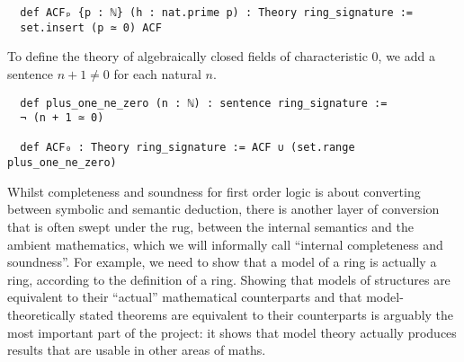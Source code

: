 \begin{dfn}
  \begin{lstlisting}
  def ACFₚ {p : ℕ} (h : nat.prime p) : Theory ring_signature :=
  set.insert (p ≃ 0) ACF\end{lstlisting}

  To define the theory of algebraically closed fields of characteristic $0$,
  we add a sentence $n + 1 \ne 0$ for each natural $n$.

  \begin{lstlisting}
  def plus_one_ne_zero (n : ℕ) : sentence ring_signature :=
  ¬ (n + 1 ≃ 0)

  def ACF₀ : Theory ring_signature := ACF ∪ (set.range plus_one_ne_zero)  \end{lstlisting}

\end{dfn}

  Whilst completeness and soundness for first order logic
  is about converting between symbolic and semantic deduction,
  there is another layer of conversion that is often swept under the rug,
  between the internal semantics and the ambient mathematics,
  which we will informally call ``internal completeness and soundness''.
  For example, we need to show that a model of a ring is
  actually a ring, according to the  definition of a ring.
  Showing that models of structures are equivalent to their ``actual'' mathematical counterparts
  and that model-theoretically stated theorems are equivalent to
  their counterparts is arguably the most important part of the project:
  it shows that model theory actually produces results that are usable
  in other areas of maths.





